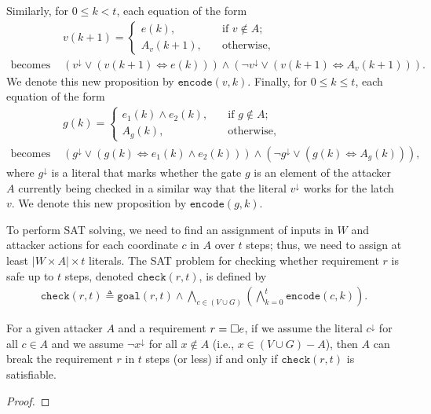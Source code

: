 {Similarly, for $0\leq k<t$, each equation of the form 
\begin{align*}
&v(k+1) = \begin{cases}
e(k), \quad &\text{if $v\not \in A$;}\\
A_v(k+1), \quad &\text{otherwise},
\end{cases}\quad
\\\text{becomes }
&\left(v^{\downarrow} \lor (v(k+1) \Leftrightarrow e(k) ) \right)\land \left(\lnot v^{\downarrow} \lor (v(k+1) \Leftrightarrow A_v(k+1)) \right).
\end{align*}
We denote this new proposition by $\mathtt{encode}(v,k)$. %
Finally, for $0\leq k \leq t$, each equation of the form
\begin{align*}
&g(k) = \begin{cases}
e_1(k)\land e_2(k), \quad &\text{if $g\not \in A$;}\\
A_g(k), \quad &\text{otherwise},
\end{cases}\\\text{becomes }
&\left(g^{\downarrow} \lor (g(k) \Leftrightarrow e_1(k)\land e_2(k) ) \right)\land \left(\lnot g^{\downarrow} \lor (g(k) \Leftrightarrow A_g(k)) \right),
\end{align*}
where $g^{\downarrow}$ is a literal that marks whether the gate $g$ is an element of the attacker $A$ currently being checked in a similar way that the literal $v^\downarrow$ works for the latch $v$. We denote this new proposition by $\mathtt{encode}(g,k)$.

To perform SAT solving, we need to find an assignment of inputs in $W$ and attacker actions for each coordinate $c$ in $A$ over $t$ steps; thus, we need to assign at least ${|W\times A|\times t}$ literals. The SAT problem for checking whether requirement $r$ is safe up to $t$ steps, denoted $\mathtt{check}(r,t)$, is defined by 
\begin{align}
\label{eq:naiveCheck}
\mathtt{check}(r,t)\triangleq\mathtt{goal}(r,t)\land\! \bigwedge_{c\in (V \cup G)}\left( \bigwedge_{k=0}^{t}{\mathtt{encode}(c,k)}\right).
\end{align}
\begin{proposition}
\label{prop:Correctness}
For a given attacker $A$ and a requirement $r={{\square}} e$, if we assume the literal $c^{\downarrow}$ for all $c \in A$ and we assume $\lnot x^{\downarrow}$ for all $x\not\in A$ (i.e., $x\in (V \cup G)-A$), then $A$ can break the requirement $r$ in $t$ steps (or less) if and only if $\mathtt{check}(r,t)$ is satisfiable.
\end{proposition}
\begin{proof}


\end{proof}}
